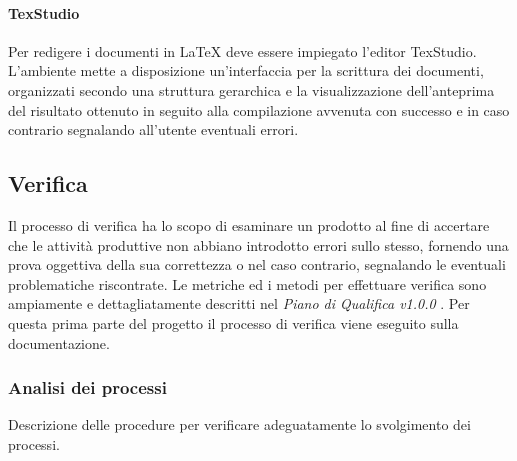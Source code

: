 \paragraph{TexStudio} \Spazio
Per redigere i documenti in \LaTeX \emph{ }deve essere impiegato l'editor TexStudio. L'ambiente mette a disposizione un'interfaccia per la scrittura dei documenti, organizzati secondo una struttura gerarchica e la visualizzazione dell'anteprima del risultato ottenuto in seguito alla compilazione avvenuta con successo e in caso contrario segnalando all'utente eventuali errori.


\subsection{Verifica}
Il processo di verifica ha lo scopo di esaminare un prodotto al fine di accertare che le attività produttive non abbiano introdotto errori sullo stesso, fornendo una prova oggettiva della sua correttezza o nel caso contrario, segnalando le eventuali problematiche riscontrate. Le metriche ed i metodi per effettuare verifica sono ampiamente e dettagliatamente descritti nel \emph{Piano di Qualifica v1.0.0} . Per questa prima parte del progetto il processo di verifica viene eseguito sulla documentazione.

\subsubsection{Analisi dei processi}
Descrizione delle procedure per verificare adeguatamente lo svolgimento dei processi.

